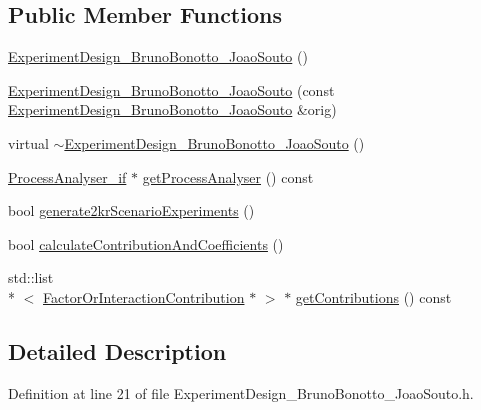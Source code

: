 \subsection*{Public Member Functions}
\begin{DoxyCompactItemize}
\item 
\hyperlink{class_experiment_design___bruno_bonotto___joao_souto_a30e36fd00466a365ede96204274f785a}{Experiment\-Design\-\_\-\-Bruno\-Bonotto\-\_\-\-Joao\-Souto} ()
\item 
\hyperlink{class_experiment_design___bruno_bonotto___joao_souto_ae0d04a62bb66d3644ed8ca9a1a9030ec}{Experiment\-Design\-\_\-\-Bruno\-Bonotto\-\_\-\-Joao\-Souto} (const \hyperlink{class_experiment_design___bruno_bonotto___joao_souto}{Experiment\-Design\-\_\-\-Bruno\-Bonotto\-\_\-\-Joao\-Souto} \&orig)
\item 
virtual \hyperlink{class_experiment_design___bruno_bonotto___joao_souto_ad4ad24c89e6795fdf599244589d552ed}{$\sim$\-Experiment\-Design\-\_\-\-Bruno\-Bonotto\-\_\-\-Joao\-Souto} ()
\item 
\hyperlink{class_process_analyser__if}{Process\-Analyser\-\_\-if} $\ast$ \hyperlink{class_experiment_design___bruno_bonotto___joao_souto_af63258b3a78ef9d5f9b2b9e4da68e9ec}{get\-Process\-Analyser} () const 
\item 
bool \hyperlink{class_experiment_design___bruno_bonotto___joao_souto_a0feb20dd354e94d17ae2689546233a98}{generate2kr\-Scenario\-Experiments} ()
\item 
bool \hyperlink{class_experiment_design___bruno_bonotto___joao_souto_a1afd5f05fa9fc12e8a391cfe60850ee1}{calculate\-Contribution\-And\-Coefficients} ()
\item 
std\-::list\\*
$<$ \hyperlink{class_factor_or_interaction_contribution}{Factor\-Or\-Interaction\-Contribution} $\ast$ $>$ $\ast$ \hyperlink{class_experiment_design___bruno_bonotto___joao_souto_a924ad9f9b00fc078bdb25d0199ea0be4}{get\-Contributions} () const 
\end{DoxyCompactItemize}


\subsection{Detailed Description}


Definition at line 21 of file Experiment\-Design\-\_\-\-Bruno\-Bonotto\-\_\-\-Joao\-Souto.\-h.



